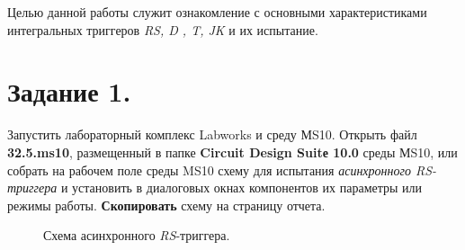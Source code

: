 \documentclass[bachelor, och, otchet, hidelinks]{SCWorks}
\begin{document}


\tableofcontents






\intro

\par Целью данной работы служит ознакомление с основными характеристиками интегральных триггеров \textit{RS, D
, T, JK} и их испытание.

\section*{Задание 1.}

Запустить лабораторный комплекс Labworks и среду МS10. Открыть файл \textbf{32.5.ms10}, размещенный в папке 
\textbf{Circuit Design Suitе 10.0} среды МS10, или собрать на рабочем поле среды MS10 схему для испытания 
\textit{асинхронного RS-триггера} и установить в диалоговых окнах компонентов их параметры или режимы работы. 
\textbf{Скопировать} схему на страницу отчета.

\begin{figure}[h]
	\caption{Схема асинхронного \textit{RS}-триггера.}
\end{figure}
\end{document}
